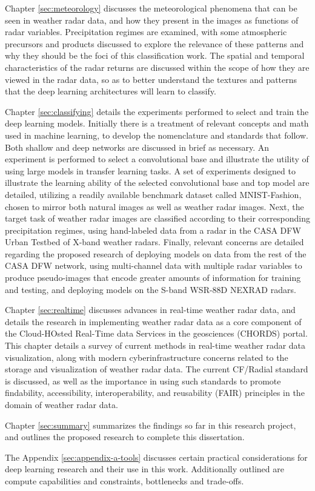 Chapter \ref{sec:meteorology} discusses the meteorological phenomena that can be seen in weather radar data, and how they present in the images as functions of radar variables.
Precipitation regimes are examined, with some atmospheric precursors and products discussed to explore the relevance of these patterns and why they should be the foci of this classification work.
The spatial and temporal characteristics of the radar returns are discussed within the scope of how they are viewed in the radar data, so as to better understand the textures and patterns that the deep learning architectures will learn to classify.

Chapter \ref{sec:classifying} details the experiments performed to select and train the deep learning models.
Initially there is a treatment of relevant concepts and math used in machine learning, to develop the nomenclature and standards that follow.
Both shallow and deep networks are discussed in brief as necessary.
An experiment is performed to select a convolutional base and illustrate the utility of using large models in transfer learning tasks.
A set of experiments designed to illustrate the learning ability of the selected convolutional base and top model are detailed, utilizing a readily available benchmark dataset called MNIST-Fashion, chosen to mirror both natural images as well as weather radar images.
Next, the target task of weather radar images are classified according to their corresponding precipitation regimes, using hand-labeled data from a radar in the CASA DFW Urban Testbed of X-band weather radars.
Finally, relevant concerns are detailed regarding the proposed research of deploying models on data from the rest of the CASA DFW network, using multi-channel data with multiple radar variables to produce pseudo-images that encode greater amounts of information for training and testing, and deploying models on the S-band WSR-88D NEXRAD radars.

Chapter \ref{sec:realtime} discusses advances in real-time weather radar data, and details the research in implementing weather radar data as a core component of the Cloud-HOsted Real-Time data Services in the geosciences (CHORDS) portal.
This chapter details a survey of current methods in real-time weather radar data visualization, along with modern cyberinfrastructure concerns related to the storage and visualization of weather radar data.
The current CF/Radial standard is discussed, as well as the importance in using such standards to promote findability, accessibility, interoperability, and reusability (FAIR) principles in the domain of weather radar data.

Chapter \ref{sec:summary} summarizes the findings so far in this research project, and outlines the proposed research to complete this dissertation.

The Appendix \ref{sec:appendix-a-tools} discusses certain practical considerations for deep learning research and their use in this work.
Additionally outlined are compute capabilities and constraints, bottlenecks and trade-offs.